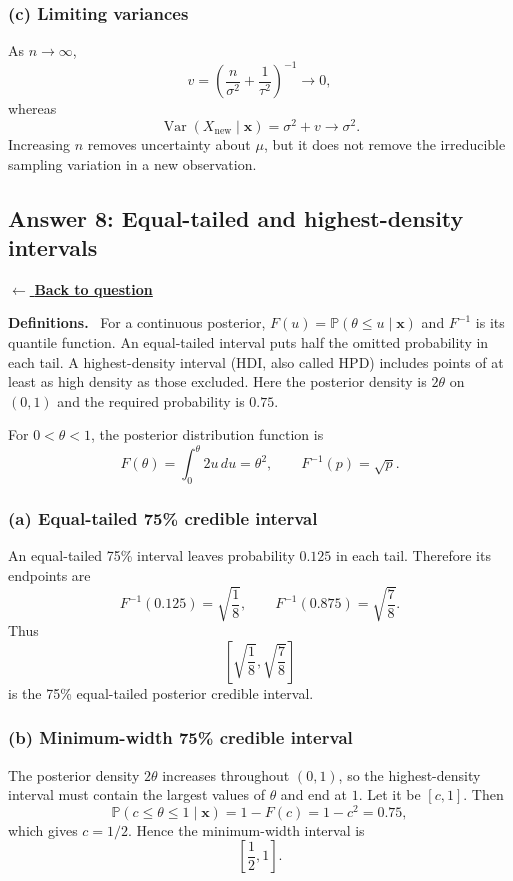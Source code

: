 \documentclass[11pt,a4paper]{article}
\newcommand{\given}{\mathrel{|}}
\newcommand{\xvec}{\boldsymbol{x}}
\newcommand{\answernav}[1]{%
  \label{answer:#1}%
  \noindent\hyperref[question:#1]{$\leftarrow$ \textbf{Back to question}}%
  \par\smallskip}
\newcommand{\studyheading}[1]{%
  \par\medskip\noindent\textcolor{statblue}{\textbf{#1.}}\ }
\begin{document}
\subsubsection*{(c) Limiting variances}

As $n\to\infty$,
\[
  v=\left(\frac{n}{\sigma^2}+\frac{1}{\tau^2}\right)^{-1}
  \longrightarrow0,
\]
whereas
\[
  \operatorname{Var}(X_{\mathrm{new}}\given\xvec)
  =\sigma^2+v
  \longrightarrow\sigma^2.
\]
Increasing $n$ removes uncertainty about $\mu$, but it does not remove the
irreducible sampling variation in a new observation.

\clearpage

\subsection{Answer 8: Equal-tailed and highest-density intervals}
\answernav{8}

\studyheading{Definitions}
For a continuous posterior, $F(u)=\mathbb P(\theta\le u\given\xvec)$ and $F^{-1}$ is its quantile function.
An equal-tailed interval puts half the omitted probability in each tail.
A highest-density interval (HDI, also called HPD) includes points of at least as high density as those excluded.
Here the posterior density is $2\theta$ on $(0,1)$ and the required probability is $0.75$.

For $0<\theta<1$, the posterior distribution function is
\[
  F(\theta)=\int_0^\theta 2u\,du=\theta^2,
  \qquad
  F^{-1}(p)=\sqrt{p}.
\]

\subsubsection*{(a) Equal-tailed 75\% credible interval}

An equal-tailed 75\% interval leaves probability $0.125$ in each tail.
Therefore its endpoints are
\[
  F^{-1}(0.125)=\sqrt{\frac18},
  \qquad
  F^{-1}(0.875)=\sqrt{\frac78}.
\]
Thus
\[
  \boxed{
    \left[\sqrt{\frac18},\sqrt{\frac78}\right]
  }
\]
is the 75\% equal-tailed posterior credible interval.

\subsubsection*{(b) Minimum-width 75\% credible interval}

The posterior density $2\theta$ increases throughout $(0,1)$, so the
highest-density interval must contain the largest values of $\theta$ and end
at $1$. Let it be $[c,1]$. Then
\[
  \mathbb{P}(c\leq\theta\leq1\given\xvec)
  =1-F(c)=1-c^2=0.75,
\]
which gives $c=1/2$. Hence the minimum-width interval is
\[
  \boxed{\left[\frac12,1\right]}.
\]
\end{document}
